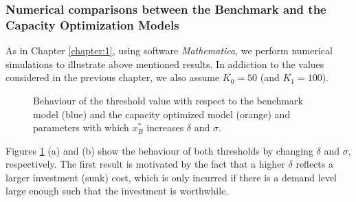 \subsubsection{Numerical comparisons between the Benchmark and the Capacity Optimization Models}

As in Chapter \ref{chapter:1}, using software \textit{Mathematica}, we perform numerical simulations to illustrate above mentioned results. 
In addiction to the values considered in the previous chapter, we also assume $K_0=50$ (and $K_1=100$).



\begin{figure}[!htb]
	\begin{subfigmatrix}{2}
	\end{subfigmatrix}
	\caption{Behaviour of the threshold value with respect to the benchmark model (blue) and the capacity optimized model (orange) and parameters with which $x^*_B$ increases $\delta$ and $\sigma$.}
	\label{fig:2_x2}
\end{figure}


Figures \ref{fig:2_x2} (a) and (b) show the behaviour of both thresholds by changing $\delta$ and $\sigma$, respectively. 
The first result is motivated by the fact that a higher $\delta$ reflects a larger investment (sunk) cost, which is only incurred if there is a demand level large enough such that the investment is worthwhile.

